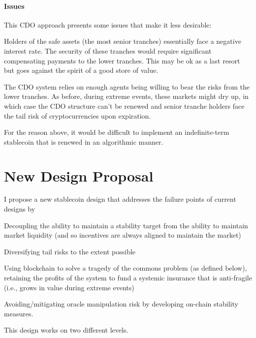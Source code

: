 \documentclass[10pt]{article}
\begin{document}
\paragraph{Issues}
This CDO approach presents some issues that make it less desirable:
\begin{compactitem}
	\item Holders of the safe assets (the most senior tranches) essentially face a negative interest rate. The security of these tranches would require significant compensating payments to the lower tranches. This may be ok as a last resort but goes against the spirit of a good store of value.
	
	\item The CDO system relies on enough agents being willing to bear the risks from the lower tranches. As before, during extreme events, these markets might dry up, in which case the CDO structure can't be renewed and senior tranche holders face the tail risk of cryptocurrencies upon expiration.
	
	\item For the reason above, it would be difficult to implement an indefinite-term stablecoin that is renewed in an algorithmic manner.
\end{compactitem}


\section{New Design Proposal}\label{sec:new_design}

I propose a new stablecoin design that addresses the failure points of current designs by
\begin{compactenum}
\item Decoupling the ability to maintain a stability target from the ability to maintain market liquidity (and so incentives are always aligned to maintain the market)
\item Diversifying tail risks to the extent possible
\item Using blockchain to solve a tragedy of the commons problem (as defined below), retaining the profits of the system to fund a systemic insurance that is anti-fragile (i.e., grows in value during extreme events)
\item Avoiding/mitigating oracle manipulation risk by developing on-chain stability measures.
\end{compactenum}
This design works on two different levels. 
\end{document}
